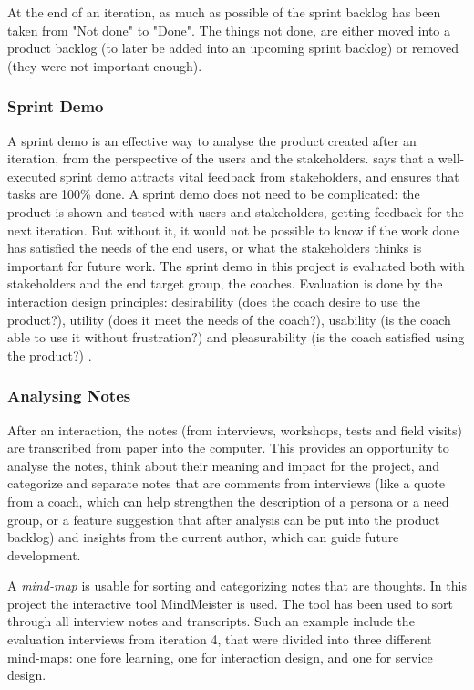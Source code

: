 At the end of an iteration, as much as possible of the sprint backlog has been taken from "Not done" to "Done". The things not done, are either moved into a product backlog (to later be added into an upcoming sprint backlog) or removed (they were not important enough).

\subsubsection{Sprint Demo}
A sprint demo is an effective way to analyse the product created after an iteration, from the perspective of the users and the stakeholders. \cite{kniberg} says that a well-executed sprint demo attracts vital feedback from stakeholders, and ensures that tasks are 100\% done. A sprint demo does not need to be complicated: the product is shown and tested with users and stakeholders, getting feedback for the next iteration. But without it, it would not be possible to know if the work done has satisfied the needs of the end users, or what the stakeholders thinks is important for future work. The sprint demo in this project is evaluated both with stakeholders and the end target group, the coaches. Evaluation is done by the interaction design principles: desirability (does the coach desire to use the product?), utility (does it meet the needs of the coach?), usability (is the coach able to use it without frustration?) and pleasurability (is the coach satisfied using the product?) \citep{clatworthy}.

\subsubsection{Analysing Notes}
After an interaction, the notes (from interviews, workshops, tests and field visits) are transcribed from paper into the computer. This provides an opportunity to analyse the notes, think about their meaning and impact for the project, and categorize and separate notes that are comments from interviews (like a quote from a coach, which can help strengthen the description of a persona or a need group, or a feature suggestion that after analysis can be put into the product backlog) and insights from the current author, which can guide future development.

A \textit{mind-map} is usable for sorting and categorizing notes that are thoughts. In this project the interactive tool MindMeister \citep{mindmeister} is used. The tool has been used to sort through all interview notes and transcripts. Such an example include the evaluation interviews from iteration 4, that were divided into three different mind-maps: one fore learning, one for interaction design, and one for service design.

